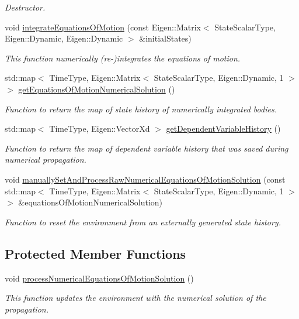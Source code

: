 \begin{DoxyCompactItemize}
\begin{DoxyCompactList}\small\item\em Destructor. \end{DoxyCompactList}\item 
void \hyperlink{classtudat_1_1propagators_1_1SingleArcDynamicsSimulator_ab08dedc11f3ca6263b29befcde9e69dc}{integrate\+Equations\+Of\+Motion} (const Eigen\+::\+Matrix$<$ State\+Scalar\+Type, Eigen\+::\+Dynamic, Eigen\+::\+Dynamic $>$ \&initial\+States)
\begin{DoxyCompactList}\small\item\em This function numerically (re-\/)integrates the equations of motion. \end{DoxyCompactList}\item 
std\+::map$<$ Time\+Type, Eigen\+::\+Matrix$<$ State\+Scalar\+Type, Eigen\+::\+Dynamic, 1 $>$ $>$ \hyperlink{classtudat_1_1propagators_1_1SingleArcDynamicsSimulator_a3bee0fe8d187e44d26d98d36d72bf25a}{get\+Equations\+Of\+Motion\+Numerical\+Solution} ()
\begin{DoxyCompactList}\small\item\em Function to return the map of state history of numerically integrated bodies. \end{DoxyCompactList}\item 
std\+::map$<$ Time\+Type, Eigen\+::\+Vector\+Xd $>$ \hyperlink{classtudat_1_1propagators_1_1SingleArcDynamicsSimulator_a45c0f42aa728852cb57a916d792b2e44}{get\+Dependent\+Variable\+History} ()
\begin{DoxyCompactList}\small\item\em Function to return the map of dependent variable history that was saved during numerical propagation. \end{DoxyCompactList}\item 
void \hyperlink{classtudat_1_1propagators_1_1SingleArcDynamicsSimulator_ac4ecdeebe82d8b3e80617c982c7872ad}{manually\+Set\+And\+Process\+Raw\+Numerical\+Equations\+Of\+Motion\+Solution} (const std\+::map$<$ Time\+Type, Eigen\+::\+Matrix$<$ State\+Scalar\+Type, Eigen\+::\+Dynamic, 1 $>$ $>$ \&equations\+Of\+Motion\+Numerical\+Solution)
\begin{DoxyCompactList}\small\item\em Function to reset the environment from an externally generated state history. \end{DoxyCompactList}\end{DoxyCompactItemize}
\subsection*{Protected Member Functions}
\begin{DoxyCompactItemize}
\item 
void \hyperlink{classtudat_1_1propagators_1_1SingleArcDynamicsSimulator_a351d3d697039d983a7b6b24b85122f32}{process\+Numerical\+Equations\+Of\+Motion\+Solution} ()
\begin{DoxyCompactList}\small\item\em This function updates the environment with the numerical solution of the propagation. \end{DoxyCompactList}\end{DoxyCompactItemize}
